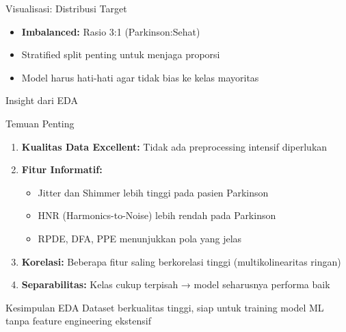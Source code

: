 \documentclass[aspectratio=169]{beamer}
\begin{document}
\begin{frame}{Visualisasi: Distribusi Target}
\begin{center}
\end{center}

\begin{itemize}
    \item \textbf{Imbalanced:} Rasio 3:1 (Parkinson:Sehat)
    \item Stratified split penting untuk menjaga proporsi
    \item Model harus hati-hati agar tidak bias ke kelas mayoritas
\end{itemize}
\end{frame}

\begin{frame}{Insight dari EDA}
\begin{block}{Temuan Penting}
\begin{enumerate}
    \item \textbf{Kualitas Data Excellent:} Tidak ada preprocessing intensif diperlukan
    \item \textbf{Fitur Informatif:} 
    \begin{itemize}
        \item Jitter dan Shimmer lebih tinggi pada pasien Parkinson
        \item HNR (Harmonics-to-Noise) lebih rendah pada Parkinson
        \item RPDE, DFA, PPE menunjukkan pola yang jelas
    \end{itemize}
    \item \textbf{Korelasi:} Beberapa fitur saling berkorelasi tinggi (multikolinearitas ringan)
    \item \textbf{Separabilitas:} Kelas cukup terpisah → model seharusnya performa baik
\end{enumerate}
\end{block}

\begin{alertblock}{Kesimpulan EDA}
Dataset berkualitas tinggi, siap untuk training model ML tanpa feature engineering ekstensif
\end{alertblock}
\end{frame}
\end{document}
